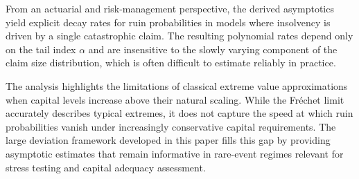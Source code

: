 \documentclass[11pt,reqno]{amsart}
\theoremstyle{definition}
\theoremstyle{remark}
\numberwithin{equation}{section}
\begin{document}
From an actuarial and risk-management perspective,  the
derived asymptotics yield explicit decay rates for ruin probabilities in models
where insolvency is driven by a single catastrophic claim. The resulting
polynomial rates depend only on the tail index $\alpha$ and are insensitive to
the slowly varying component of the claim size distribution, which is often
difficult to estimate reliably in practice.

The analysis highlights the limitations of classical extreme value
approximations when capital levels increase above their natural
scaling. While the Fr\'echet limit accurately describes typical extremes, it
does not capture the speed at which ruin probabilities vanish under
increasingly conservative capital requirements. The large deviation framework
developed in this paper fills this gap by providing asymptotic estimates that
remain informative in rare-event regimes relevant for stress testing and
capital adequacy assessment.

%
\end{document}

